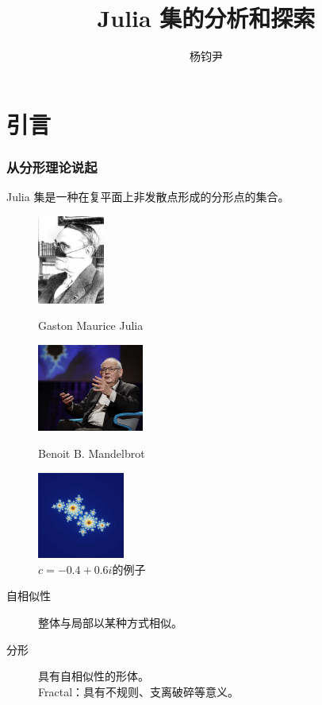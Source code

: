 \documentclass[8pt,c,compress,UTF8]{ctexbeamer}
\title{Julia 集的分析和探索}
\author{杨钧尹}
\institute{浙江大学 数学科学学院}
\begin{document}
\thispagestyle{empty}   %
\maketitle

\section{引言}

\begin{frame}
\frametitle{从分形理论说起}
\centering
Julia 集是一种在复平面上非发散点形成的分形点的集合。
\begin{figure}[htbp]
\centering
\begin{minipage}{0.33\linewidth}
\centering
\includegraphics[width = 2.2cm]{./images/julia.jpg}
\caption*{\small Gaston Maurice Julia}
\end{minipage}\hfill
\begin{minipage}{0.33\linewidth}
\centering
\includegraphics[width = 3.5cm]{./images/mandelbort.png}
\caption*{\small Benoit B. Mandelbrot}
\end{minipage}\hfill
\begin{minipage}{0.33\linewidth}
\includegraphics[width = 2.85cm]{./images/julia_set_example.png}
\centering
\caption*{\small $c=−0.4+0.6i$的例子}
\end{minipage}
\end{figure}
\begin{description}
\item[自相似性]整体与局部以某种方式相似。
\item[分形]具有自相似性的形体。\\Fractal：具有不规则、支离破碎等意义。
\end{description}
\end{frame}
\end{document}
